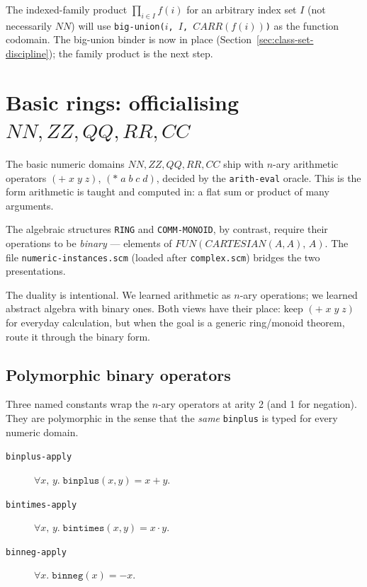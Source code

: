 \begin{remark}
The indexed-family product $\prod_{i \in I} f(i)$ for an arbitrary
index set $I$ (not necessarily $\mathit{NN}$) will use
\texttt{big-union($i$, $I$, $CARR(f(i))$)} as the function codomain.
The big-union binder is now in place
(Section~\ref{sec:class-set-discipline}); the family product is the next
step.
\end{remark}

\section{Basic rings: officialising $\mathit{NN}, \mathit{ZZ}, \mathit{QQ}, \mathit{RR}, \mathit{CC}$}
\label{sec:basic-rings}

The basic numeric domains $\mathit{NN}, \mathit{ZZ}, \mathit{QQ},
\mathit{RR}, \mathit{CC}$ ship with $n$-ary arithmetic operators
$(+\; x\; y\; z)$, $(*\; a\; b\; c\; d)$, decided by the
\texttt{arith-eval} oracle.  This is the form arithmetic is taught and
computed in: a flat sum or product of many arguments.

The algebraic structures \texttt{RING} and \texttt{COMM-MONOID}, by
contrast, require their operations to be \emph{binary} ---
elements of $\mathit{FUN}(\mathit{CARTESIAN}(A, A),\, A)$.  The file
\texttt{numeric-instances.scm} (loaded after \texttt{complex.scm}) bridges
the two presentations.

\begin{remark}
The duality is intentional.  We learned arithmetic as $n$-ary
operations; we learned abstract algebra with binary ones.  Both views
have their place: keep $(+\; x\; y\; z)$ for everyday calculation, but
when the goal is a generic ring/monoid theorem, route it through the
binary form.
\end{remark}

\subsection{Polymorphic binary operators}

Three named constants wrap the $n$-ary operators at arity 2 (and 1 for
negation).  They are polymorphic in the sense that the \emph{same}
\texttt{binplus} is typed for every numeric domain.

\begin{description}
\item[\texttt{binplus-apply}]
  $\forall x,\, y.\;\mathtt{binplus}(x, y) = x + y$.
\item[\texttt{bintimes-apply}]
  $\forall x,\, y.\;\mathtt{bintimes}(x, y) = x \cdot y$.
\item[\texttt{binneg-apply}]
  $\forall x.\;\mathtt{binneg}(x) = -x$.
\end{description}

